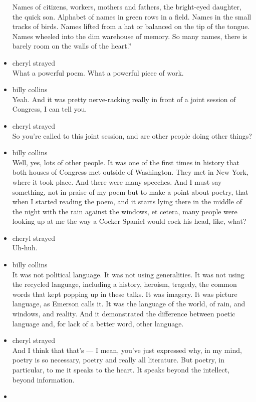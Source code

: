 \begin{itemize}
  Names of citizens, workers, mothers and fathers, the bright-eyed
  daughter, the quick son. Alphabet of names in green rows in a field.
  Names in the small tracks of birds. Names lifted from a hat or
  balanced on the tip of the tongue. Names wheeled into the dim
  warehouse of memory. So many names, there is barely room on the walls
  of the heart.''
\item
  cheryl strayed\\
  What a powerful poem. What a powerful piece of work.
\item
  billy collins\\
  Yeah. And it was pretty nerve-racking really in front of a joint
  session of Congress, I can tell you.
\item
  cheryl strayed\\
  So you're called to this joint session, and are other people doing
  other things?
\item
  billy collins\\
  Well, yes, lots of other people. It was one of the first times in
  history that both houses of Congress met outside of Washington. They
  met in New York, where it took place. And there were many speeches.
  And I must say something, not in praise of my poem but to make a point
  about poetry, that when I started reading the poem, and it starts
  lying there in the middle of the night with the rain against the
  windows, et cetera, many people were looking up at me the way a Cocker
  Spaniel would cock his head, like, what?
\item
  cheryl strayed\\
  Uh-huh.
\item
  billy collins\\
  It was not political language. It was not using generalities. It was
  not using the recycled language, including a history, heroism,
  tragedy, the common words that kept popping up in these talks. It was
  imagery. It was picture language, as Emerson calls it. It was the
  language of the world, of rain, and windows, and reality. And it
  demonstrated the difference between poetic language and, for lack of a
  better word, other language.
\item
  cheryl strayed\\
  And I think that that's --- I mean, you've just expressed why, in my
  mind, poetry is so necessary, poetry and really all literature. But
  poetry, in particular, to me it speaks to the heart. It speaks beyond
  the intellect, beyond information.
\item

\end{itemize}
